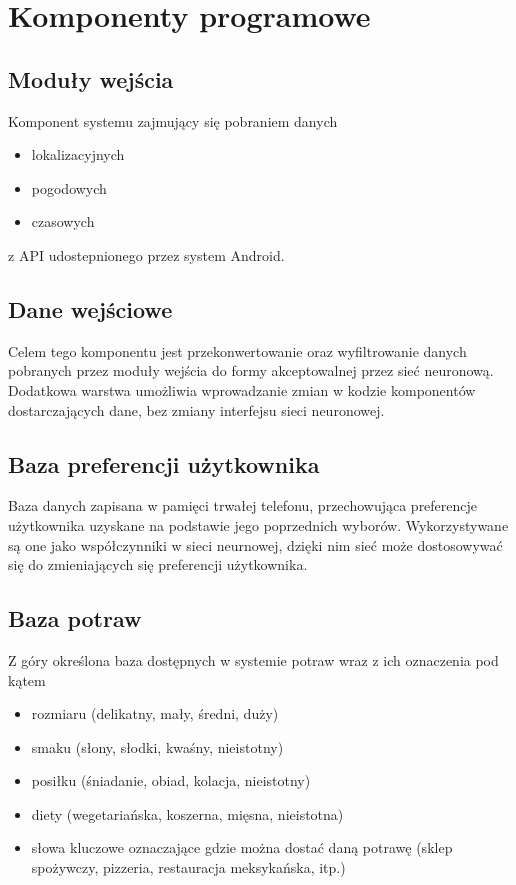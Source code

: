 \documentclass[a4paper,twoside,11pt]{article}
\begin{document}
\section{Komponenty programowe}

\subsection{Moduły wejścia}
Komponent systemu zajmujący się pobraniem danych
\begin{itemize}
	\item lokalizacyjnych
	\item pogodowych
	\item czasowych
\end{itemize}
z API udostepnionego przez system Android.

\subsection{Dane wejściowe}
Celem tego komponentu jest przekonwertowanie oraz wyfiltrowanie danych pobranych przez moduły wejścia do formy akceptowalnej przez sieć neuronową. Dodatkowa warstwa umożliwia wprowadzanie zmian w kodzie komponentów dostarczających dane, bez zmiany interfejsu sieci neuronowej.

\subsection{Baza preferencji użytkownika}
Baza danych zapisana w pamięci trwałej telefonu, przechowująca preferencje użytkownika uzyskane na podstawie jego poprzednich wyborów. Wykorzystywane są one jako współczynniki w sieci neurnowej, dzięki nim sieć może dostosowywać się do  zmieniających się preferencji użytkownika.

\subsection{Baza potraw}
Z góry określona baza dostępnych w systemie potraw wraz z ich oznaczenia pod kątem
\begin{itemize}
	\item rozmiaru (delikatny, mały, średni, duży)
	\item smaku (słony, słodki, kwaśny, nieistotny)
	\item posiłku (śniadanie, obiad, kolacja, nieistotny)
	\item diety (wegetariańska, koszerna, mięsna, nieistotna)
	\item słowa kluczowe oznaczające gdzie można dostać daną potrawę (sklep spożywczy, pizzeria, restauracja meksykańska, itp.)
\end{itemize}
\end{document}
